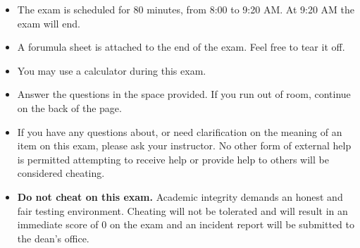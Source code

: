 {\begin{coverpages}
{{{      \begin{itemize}
         \item  The exam is scheduled for 80 minutes, from 8:00 to 9:20 AM. At 9:20 AM the exam will end.\\
         \item  A forumula sheet is attached to the end of the exam. Feel free to tear it off.\\
         \item  You may use a calculator during this exam.\\
         \item  Answer the questions in the space provided. If you run out of room, continue on the back of the page. \\
         \item  If you have any questions about, or need clarification on the meaning of an item on this exam, please ask your instructor. No other form of external help is permitted attempting to receive help or provide help to others will be considered cheating.\\
         \item  {\bfseries Do not cheat on this exam.} Academic integrity demands an honest and fair testing environment. Cheating will not be tolerated and will result in an immediate score of 0 on the exam and an incident report will be submitted to the dean's office.\\
      \end{itemize}

   }}}

   \vspace{2cm}


   \vspace{1cm}

   \end{coverpages}

}


